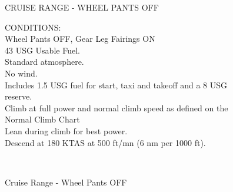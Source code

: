 \begin{figure}[t]
\begin{center}
\begin{perfhdr}CRUISE RANGE - WHEEL PANTS OFF\\
\end{perfhdr}

\begin{minipage}{5in}
  \begin{flushleft}
    CONDITIONS:\\
    Wheel Pants OFF, Gear Leg Fairings ON\\
    43 USG Usable Fuel.\\
    Standard atmosphere.\\
    No wind.\\
    Includes 1.5 USG fuel for start, taxi and takeoff and a 8 USG reserve.\\
    Climb at full power and normal climb speed as defined on the Normal Climb Chart\\
    Lean during climb for best power.\\
    Descend at 180 KTAS at 500 ft/mn (6 nm per 1000 ft).\\
    \end{flushleft}
\end{minipage}\\
\vspace{5ex}
\end{center}  %
\caption{Cruise Range - Wheel Pants OFF}
\label{Cruise-range-WP-OFF}
\end{figure}
\clearpage


